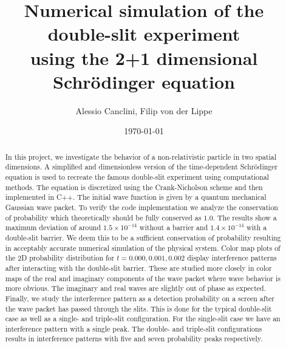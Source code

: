 \documentclass[english,notitlepage,reprint,nofootinbib]{revtex4-1}  %
\begin{document}
\raggedbottom

\title{Numerical simulation of the double-slit experiment \\using the 2+1 dimensional Schrödinger equation}  %
\author{Alessio Canclini, Filip von der Lippe} %
\date{\today}                             %
\noaffiliation                            %

\begin{abstract}
    In this project, we investigate the behavior of a non-relativistic particle in two spatial dimensions. A simplified and dimensionless version of the time-dependent Schrödinger equation is used to recreate the famous double-slit experiment using computational methods. The equation is discretized using the Crank-Nicholson scheme and then implemented in C++. The initial wave function is given by a quantum mechanical Gaussian wave packet. To verify the code implementation we analyze the conservation of probability which theoretically should be fully conserved as $1.0$. The results show a maximum deviation of around $1.5 \times 10^{-14}$ without a barrier and  $1.4 \times 10^{-14}$ with a double-slit barrier. We deem this to be a sufficient conservation of probability resulting in acceptably accurate numerical simulation of the physical system. Color map plots of the 2D probability distribution for $t= 0.000, 0.001, 0.002$ display interference patterns after interacting with the double-slit barrier. These are studied more closely in color maps of the real and imaginary components of the wave packet where wave behavior is more obvious. The imaginary and real waves are slightly out of phase as expected. Finally, we study the interference pattern as a detection probability on a screen after the wave packet has passed through the slits. This is done for the typical double-slit case as well as a single- and triple-slit configuration. For the single-slit case we have an interference pattern with a single peak. The double- and triple-slit configurations results in interference patterns with five and seven probability peaks respectively.
\end{abstract}
\maketitle


\end{document}
